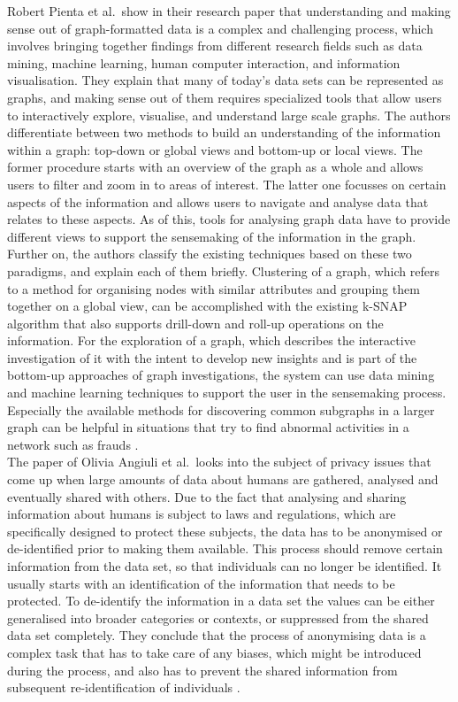 Robert Pienta et al.\ show in their research paper that understanding and making sense out of graph-formatted data is a complex and challenging process, which involves bringing together findings from different research fields such as data mining, machine learning, human computer interaction, and information visualisation. They explain that many of today’s data sets can be represented as graphs, and making sense out of them requires specialized tools that allow users to interactively explore, visualise, and understand large scale graphs. The authors differentiate between two methods to build an understanding of the information within a graph: top-down or global views and bottom-up or local views. The former procedure starts with an overview of the graph as a whole and allows users to filter and zoom in to areas of interest. The latter one focusses on certain aspects of the information and allows users to navigate and analyse data that relates to these aspects. As of this, tools for analysing graph data have to provide different views to support the sensemaking of the information in the graph. Further on, the authors classify the existing techniques based on these two paradigms, and explain each of them briefly. Clustering of a graph, which refers to a method for organising nodes with similar attributes and grouping them together on a global view, can be accomplished with the existing k-SNAP algorithm that also supports drill-down and roll-up operations on the information. For the exploration of a graph, which describes the interactive investigation of it with the intent to develop new insights and is part of the bottom-up approaches of graph investigations, the system can use data mining and machine learning techniques to support the user in the sensemaking process. Especially the available methods for discovering common subgraphs in a larger graph can be helpful in situations that try to find abnormal activities in a network such as frauds \citep{pienta2015scalable}. \\

The paper of Olivia Angiuli et al.\ looks into the subject of privacy issues that come up when large amounts of data about humans are gathered, analysed and eventually shared with others. Due to the fact that analysing and sharing information about humans is subject to laws and regulations, which are specifically designed to protect these subjects, the data has to be anonymised or de-identified prior to making them available. This process should remove certain information from the data set, so that individuals can no longer be identified. It usually starts with an identification of the information that needs to be protected. To de-identify the information in a data set the values can be either generalised into broader categories or contexts, or suppressed from the shared data set completely. They conclude that the process of anonymising data is a complex task that has to take care of any biases, which might be introduced during the process, and also has to prevent the shared information from subsequent re-identification of individuals \citep{angiuli2015identify}.

